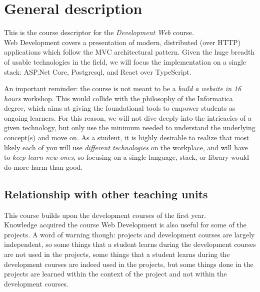 \section{General description}
	This is the course descriptor for the \emph{Development Web} course.
\\
Web Development covers a presentation of modern, distributed (over HTTP)
applications which follow the MVC architectural pattern. Given the huge
breadth of usable technologies in the field, we will focus the
implementation on a single stack: ASP.Net Core, Postgresql, and React
over TypeScript.

An important reminder: the course is not meant to be a \emph{build a
website in 16 hours} workshop. This would collide with the philosophy of
the Informatica degree, which aims at giving the foundational tools to
empower students as ongoing learners. For this reason, we will not dive
deeply into the intricacies of a given technology, but only use the
minimum needed to understand the underlying concept(s) and move on. As a
student, it is highly desirable to realize that most likely each of you
will use \emph{different technologies} on the workplace, and will have
to \emph{keep learn new ones}, so focusing on a single language, stack,
or library would do more harm than good.

	\subsection{Relationship with other teaching units}
		This course builds upon the development courses of the first year.	\\		
		Knowledge acquired the course Web Development is also useful for some of the projects. A word of warning though: projects and development courses are largely independent, so some things that a student learns during the development courses are not used in the projects, some things that a student learns during the development courses are indeed used in the projects, but some things done in the projects are learned within the context of the project and not within the development courses.

